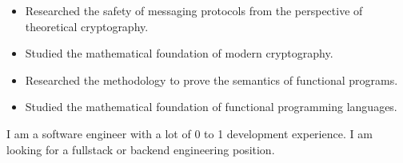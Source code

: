 \documentclass[10pt,a4paper,ragged2e,withhyper]{altacv}
\begin{document}
\begin{paracol}{2}


\begin{itemize}
  \item Researched the safety of messaging protocols from the perspective of theoretical cryptography.
  \item Studied the mathematical foundation of modern cryptography.
\end{itemize}

\divider

\begin{itemize}
  \item Researched the methodology to prove the semantics of functional programs.
  \item Studied the mathematical foundation of functional programming languages.
\end{itemize}

\medskip



\switchcolumn





I am a software engineer with a lot of 0 to 1 development experience.
I am looking for a fullstack or backend engineering position.





\end{paracol}
\end{document}
